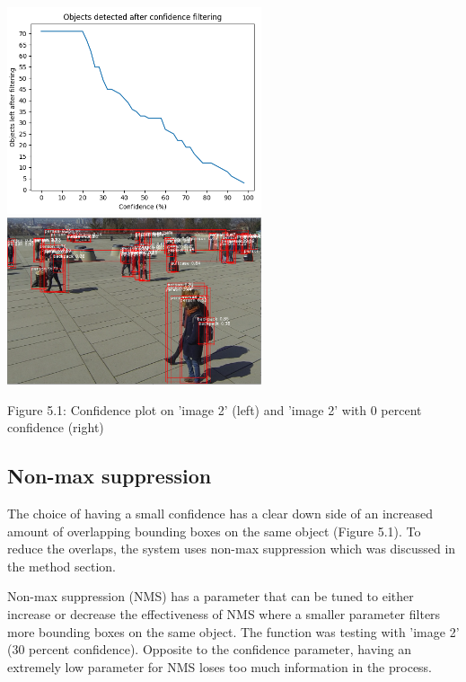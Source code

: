\documentclass[12pt]{report}
\begin{document}
\begin{center}
\includegraphics[width=75mm]{./images/appendix/ConfidencePlot.PNG}
\includegraphics[width=75mm]{./images/zeroConfidence.PNG}

\vspace{3mm}
{\footnotesize Figure 5.1: Confidence plot on 'image 2' (left) and 'image 2' with 0 percent confidence (right)}
\end{center}

\subsection*{Non-max suppression}

The choice of having a small confidence has a clear down side of an increased amount of overlapping bounding boxes on the same object (Figure 5.1). To reduce the overlaps, the system uses non-max suppression which was discussed in the method section.  

\vspace{2mm}

Non-max suppression (NMS) has a parameter that can be tuned to either increase or decrease the effectiveness of NMS where a smaller parameter filters more bounding boxes on the same object. The function was testing with 'image 2' (30 percent confidence). Opposite to the confidence parameter, having an extremely low parameter for NMS loses too much information in the process. 
\end{document}

